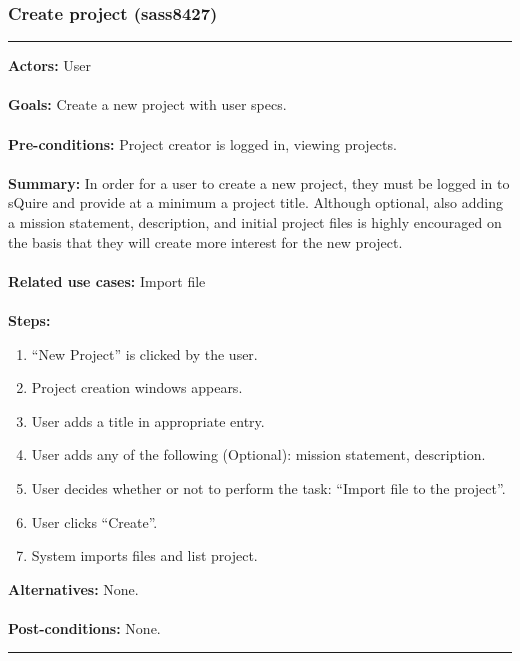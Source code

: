 \documentclass[11pt]{report}
\begin{document}
\subsubsection{Create project (sass8427)}
\vspace{2pt}
\hrule
\vspace{8pt}
 \textbf{Actors:} User \\ \\
\textbf{Goals:} Create a new project with user specs. \\ \\
 \textbf{Pre-conditions:} Project creator is logged in, viewing projects.  \\ \\
\textbf{Summary:} In order for a user to create a new project, they must be logged in to sQuire and provide at a minimum a project title. Although optional, also adding a mission statement, description, and initial project files is highly encouraged on the basis that they will create more interest for the new project. \\ \\
\textbf{Related use cases:} Import file \\ \\
\textbf{Steps:} \begin{enumerate}
  \item ``New Project'' is clicked by the user.
  \item Project creation windows appears. 
  \item User adds a title in appropriate entry. 
  \item User adds any of the following (Optional): mission statement, description.
  \item User decides whether or not to perform the task: ``Import file to the project''.
  \item User clicks ``Create''.
  \item System imports files and list project.
 \end{enumerate}
 \textbf{Alternatives:} None. \\ \\
 \textbf{Post-conditions:} None. \\
\vspace{8pt}
\hrule
\newpage
\end{document}
